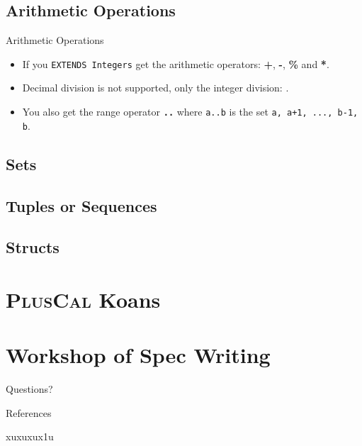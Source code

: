 \documentclass[10pt]{beamer}
\newcommand{\pluscal}{\textbf{\textsc{PlusCal}}\xspace}
\begin{document}
\subsection{Arithmetic Operations}

\begin{frame}{Arithmetic Operations}
  \begin{itemize}
    \item  If you \texttt{EXTENDS Integers} get the arithmetic operators: \textbf{+}, \textbf{-}, \textbf{\%} and \textbf{*}.
    \item  Decimal division is not supported, only the integer division: \textbf{\texttt{\div}}.
    \item You also get the range operator \textbf{\texttt{..}} where \texttt{a..b} is the set \texttt{{a, a+1, ..., b-1, b}}.
  \end{itemize}
\end{frame}

\subsection{Sets}

\subsection{Tuples or Sequences}

\subsection{Structs}


\section{\pluscal Koans}

\section{Workshop of Spec Writing}


\begin{frame}[standout]
  Questions?
\end{frame}

\appendix

\begin{frame}[allowframebreaks]{References}

  \nocite{*}  xuxuxux1u
  

\end{frame}
\end{document}
